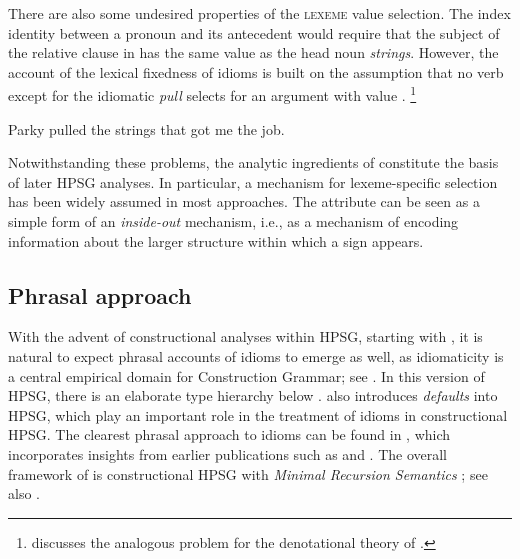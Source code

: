 \documentclass[output=paper
                ,modfonts
                ,nonflat
	        ,collection
	        ,collectionchapter
	        ,collectiontoclongg
 	        ,biblatex
                ,babelshorthands
                ,newtxmath
                ,draftmode
                ,colorlinks, citecolor=brown
]{./langsci/langscibook}
\begin{document}
There are also some undesired properties of the \textsc{lexeme} value selection. The index identity between a pronoun and its antecedent would require that the subject of the relative clause in  has the same  value as the head noun \emph{strings}. However, the account of the lexical fixedness of idioms is built on the assumption that no verb except for the idiomatic \emph{pull} selects for an argument with  value .%
\footnote{\citet{Pulman:93} discusses the analogous problem for the denotational theory of \citet{GKPS85a}.}

\ea \label{strings-relcl}
Parky pulled the strings that got me the job.
\citep[137]{McCawley:81}
\z 

Notwithstanding these problems, 
the analytic ingredients of \citet{KE94a} constitute the basis of later HPSG analyses. In particular, a mechanism for lexeme-specific selection has been widely assumed in most approaches. The attribute  can be seen as a simple form of an \emph{inside-out} mechanism, i.e., as a mechanism of encoding information about the larger structure within which a sign appears. 


\subsection{Phrasal approach}
\label{Sec-Phrasal}

With the advent of constructional analyses within HPSG, starting with \citet{Sag97a}, it is natural to expect phrasal accounts of idioms to emerge as well, as idiomaticity is a central empirical domain for Construction Grammar; see . 
In this version of HPSG, there is an elaborate type hierarchy below . 
\citet{Sag97a} also introduces \emph{defaults} into HPSG, which play an important role in the treatment of idioms in constructional HPSG.
The clearest phrasal approach to idioms can be found in \citet{Riehemann2001a}, which incorporates insights from earlier publications such as \citet{Riehemann97a} and \citet{RB99a}.
%
The overall framework of \citet{Riehemann2001a} is constructional HPSG with \emph{Minimal Recursion Semantics}  \citep{CFMRS95a-u,CFPS2005a}; see also .
\end{document}
